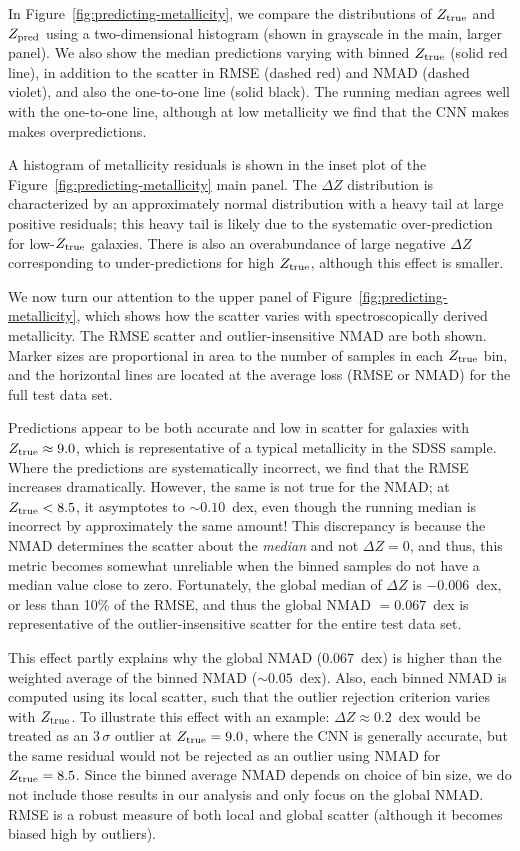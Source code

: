 \documentclass[fleqn,usenatbib]{mnras}
\begin{document}
In Figure~\ref{fig:predicting-metallicity}, we compare the distributions of $Z_{\rm true}$ and $Z_{\rm pred}$ using a two-dimensional histogram (shown in grayscale in the main, larger panel). We also show the median predictions varying with binned $Z_{\rm true}$ (solid red line), in addition to the scatter in RMSE (dashed red) and NMAD (dashed violet), and also the one-to-one line (solid black). The running median agrees well with the one-to-one line, although at low metallicity we find that the CNN makes makes overpredictions.

A histogram of metallicity residuals is shown in the inset plot of the Figure~\ref{fig:predicting-metallicity} main panel. The $\Delta Z$ distribution is characterized by an approximately normal distribution with a heavy tail at large positive residuals; this heavy tail is likely due to the systematic over-prediction for low-$Z_{\rm true}$ galaxies.
There is also an overabundance of large negative $\Delta Z$ corresponding to under-predictions for high $Z_{\rm true}$, although this effect is smaller.

We now turn our attention to the upper panel of Figure~\ref{fig:predicting-metallicity}, which shows how the scatter varies with spectroscopically derived metallicity. The RMSE scatter and outlier-insensitive NMAD are both shown. Marker sizes are proportional in area to the number of samples in each $Z_{\rm true}$ bin, and the horizontal lines are located at the average loss (RMSE or NMAD) for the full test data set.

Predictions appear to be both accurate and low in scatter for galaxies with $Z_{\rm true} \approx 9.0$, which is representative of a typical metallicity in the SDSS sample. Where the predictions are systematically incorrect, we find that the RMSE increases dramatically. However, the same is not true for the NMAD; at $Z_{\rm true} < 8.5$, it asymptotes to $\sim 0.10$~dex, even though the running median is incorrect by approximately the same amount! This discrepancy is because the NMAD determines the scatter about the \textit{median} and not $\Delta Z = 0$, and thus, this metric becomes somewhat unreliable when the binned samples do not have a median value close to zero. Fortunately, the global median of $\Delta Z$ is $-0.006$~dex, or less than 10\% of the RMSE, and thus the global NMAD $= 0.067$~dex is representative of the outlier-insensitive scatter for the entire test data set.

This effect partly explains why the global NMAD ($0.067$~dex) is higher than the weighted average of the binned NMAD ($\sim 0.05$~dex). Also, each binned NMAD is computed using its local scatter, such that the outlier rejection criterion varies with $Z_{\rm true}$. To illustrate this effect with an example: $\Delta Z \approx 0.2$~dex would be treated as an $3\,\sigma$ outlier at $Z_{\rm true} = 9.0$, where the CNN is generally accurate, but the same residual would not be rejected as an outlier using NMAD for $Z_{\rm true} = 8.5$.
Since the binned average NMAD depends on choice of bin size, we do not include those results in our analysis and only focus on the global NMAD.
RMSE is a robust measure of both local and global scatter (although it becomes biased high by outliers).
\end{document}
